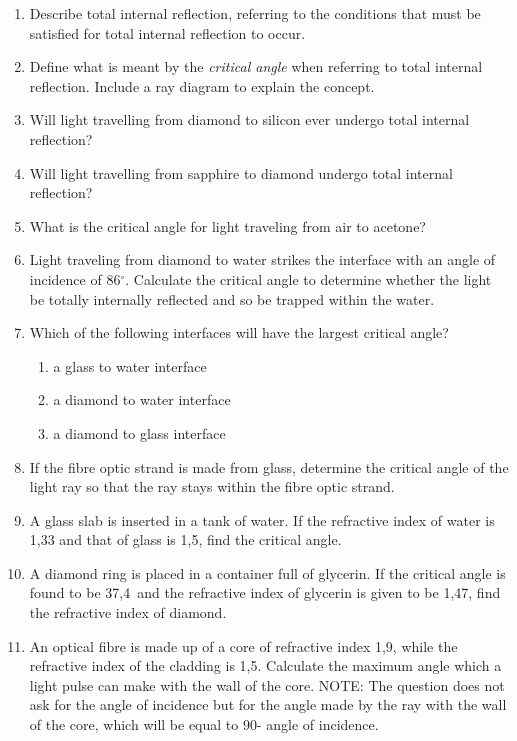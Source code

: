 {
\begin{enumerate}
\item{Describe total internal reflection, referring to the conditions that must be satisfied for total internal reflection to occur.}
\item{Define what is meant by the \textit{critical angle} when referring to total internal reflection. Include a ray diagram to explain the concept.}
\item{Will light travelling from diamond to silicon ever undergo total internal reflection?}
\item{Will light travelling from sapphire to diamond undergo total internal reflection?}
\item{What is the critical angle for light traveling from air to acetone?}
\item{Light traveling from diamond to water strikes the interface with an angle of incidence of 86$^{\circ}$. Calculate the critical angle to determine whether the light be totally internally reflected and so be trapped within the water.}
\item{Which of the following interfaces will have the largest critical angle?
\begin{enumerate}
\item{a glass to water interface}
\item{a diamond to water interface}
\item{a diamond to glass interface}
\end{enumerate}}
\item{If the fibre optic strand is made from glass, determine the critical angle of the light ray so that the ray stays within the fibre optic strand.}
\item{A glass slab is inserted in a tank of water. If the refractive index of water is 1,33 and that of glass is 1,5, find the critical angle.}
\item{A diamond ring is placed in a container full of glycerin. If the critical angle is found to be 37,4\deg\ and the refractive index of glycerin is given to be 1,47, find the refractive index of diamond.}
\item{An optical fibre is made up of a core of refractive index 1,9, while the refractive index of the cladding is 1,5. Calculate the maximum angle which a light pulse can make with the wall of the core. NOTE: The question does not ask for the angle of incidence but for the angle made by the ray with the wall of the core, which will be equal to 90\deg - angle of incidence.}
\end{enumerate}
}

